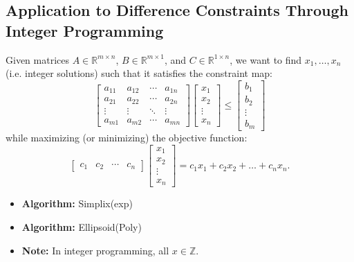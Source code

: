 \subsection{Application to Difference Constraints Through Integer Programming}
\begin{definition}
    Given matrices \( A \in \mathbb{R}^{m \times n} \), \( B \in \mathbb{R}^{m \times 1} \), and \( C \in \mathbb{R}^{1 \times n} \), we want to find \( x_1, \dots, x_n \) (i.e. integer solutions) such that it satisfies the constraint map:
    \[
    \begin{bmatrix}
    a_{11} & a_{12} & \cdots & a_{1n} \\
    a_{21} & a_{22} & \cdots & a_{2n} \\
    \vdots & \vdots & \ddots & \vdots \\
    a_{m1} & a_{m2} & \cdots & a_{mn}
    \end{bmatrix}
    \begin{bmatrix}
    x_1 \\
    x_2 \\
    \vdots \\
    x_n
    \end{bmatrix}
    \leq
    \begin{bmatrix}
    b_1 \\
    b_2 \\
    \vdots \\
    b_m
    \end{bmatrix}
    \]
    while maximizing (or minimizing) the objective function:
    \[
    \begin{bmatrix}
    c_1 & c_2 & \cdots & c_n
    \end{bmatrix}
    \begin{bmatrix}
    x_1 \\
    x_2 \\
    \vdots \\
    x_n
    \end{bmatrix}
    = c_1 x_1 + c_2 x_2 + \dots + c_n x_n.
    \]
    \begin{itemize}
        \item \textbf{Algorithm:} Simplix(exp)
        \item \textbf{Algorithm:} Ellipsoid(Poly)
        \item \textbf{Note:} In integer programming, all \( x \in \mathbb{Z} \).
    \end{itemize}
\end{definition}


